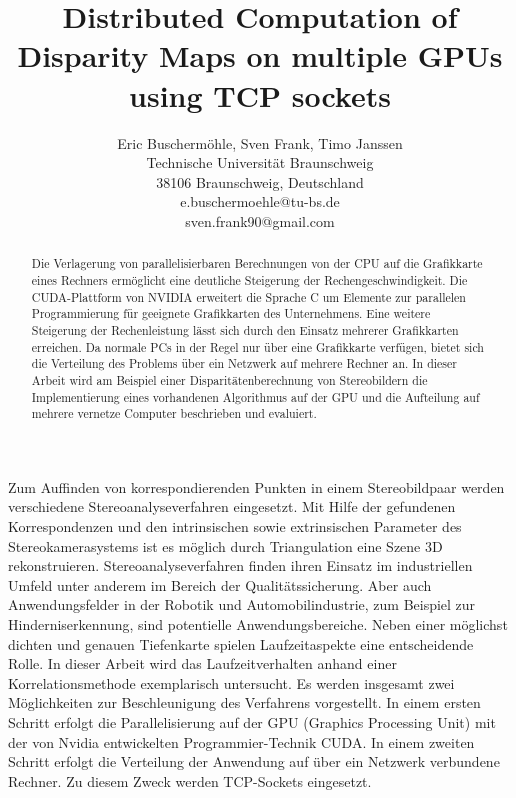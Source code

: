 \documentclass[times, 10pt,twocolumn]{article}
\begin{document}
\title{Distributed Computation of Disparity Maps on multiple GPUs using TCP sockets}

\author{Eric Buschermöhle, Sven Frank, Timo Janssen\\
Technische Universität Braunschweig \\  38106 Braunschweig, Deutschland\\
e.buschermoehle@tu-bs.de\\
sven.frank90@gmail.com\\
}


\maketitle
\thispagestyle{empty}

\begin{abstract}
Die Verlagerung von parallelisierbaren Berechnungen von der CPU auf die Grafikkarte eines Rechners ermöglicht eine deutliche Steigerung der Rechengeschwindigkeit. Die CUDA-Plattform von NVIDIA erweitert die Sprache C um Elemente zur parallelen Programmierung für geeignete Grafikkarten des Unternehmens. Eine weitere Steigerung der Rechenleistung lässt sich durch den Einsatz mehrerer Grafikkarten erreichen. Da normale PCs in der Regel nur über eine Grafikkarte verfügen, bietet sich die Verteilung des Problems über ein Netzwerk auf mehrere Rechner an. In dieser Arbeit wird am Beispiel einer Disparitätenberechnung von Stereobildern die Implementierung eines vorhandenen Algorithmus auf der GPU und die Aufteilung auf mehrere vernetze Computer beschrieben und evaluiert.
 
\end{abstract}




Zum Auffinden von korrespondierenden Punkten in einem Stereobildpaar werden verschiedene Stereoanalyseverfahren eingesetzt. Mit Hilfe der gefundenen Korrespondenzen und den intrinsischen sowie extrinsischen Parameter des Stereokamerasystems ist es möglich durch Triangulation eine Szene 3D rekonstruieren. Stereoanalyseverfahren finden ihren Einsatz im industriellen Umfeld unter anderem im Bereich der Qualitätssicherung. Aber auch Anwendungsfelder in der Robotik und Automobilindustrie, zum Beispiel zur Hinderniserkennung, sind potentielle Anwendungsbereiche. Neben einer möglichst dichten und genauen Tiefenkarte spielen Laufzeitaspekte eine entscheidende Rolle. In dieser Arbeit wird das Laufzeitverhalten anhand einer Korrelationsmethode exemplarisch untersucht. Es werden insgesamt zwei Möglichkeiten zur Beschleunigung des Verfahrens vorgestellt. In einem ersten Schritt erfolgt die Parallelisierung auf der GPU (Graphics Processing Unit) mit der von Nvidia entwickelten Programmier-Technik CUDA. In einem zweiten Schritt erfolgt die Verteilung der Anwendung auf über ein Netzwerk verbundene Rechner. Zu diesem Zweck werden TCP-Sockets eingesetzt.
\end{document}
